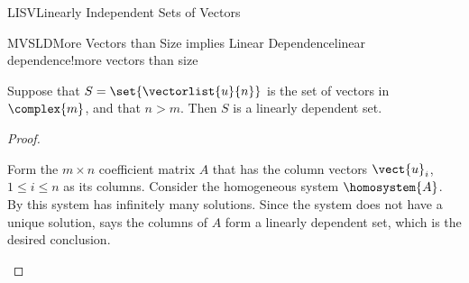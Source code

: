 \begin{subsect}{LISV}{Linearly Independent Sets of Vectors}
\begin{theorem}{MVSLD}{More Vectors than Size implies Linear Dependence}{linear dependence!more vectors than size}
\begin{para}Suppose that $S=\set{\vectorlist{u}{n}}$ is the set of vectors in $\complex{m}$, and that
$n>m$.
Then $S$ is a linearly dependent set.\end{para}
\end{theorem}
%
\begin{proof}
\begin{para}Form the $m\times n$ coefficient matrix $A$ that has the column vectors $\vect{u}_i$, $1\leq i\leq n$ as its columns.  Consider the homogeneous system $\homosystem{A}$.  By  this system has infinitely many solutions.  Since the system does not have a unique solution,  says the columns of $A$ form a linearly dependent set, which is the desired conclusion.
\end{para}
\end{proof}
%
%
\end{subsect}
%
